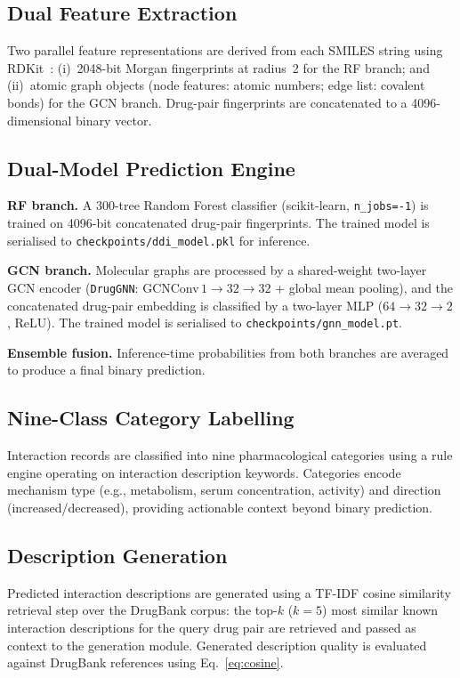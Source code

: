 \documentclass[conference]{IEEEtran}
\begin{document}
\subsection{Dual Feature Extraction}

Two parallel feature representations are derived from each SMILES string using
RDKit~\cite{rdkit}: (i)~2048-bit Morgan fingerprints at radius~2 for the RF branch; and
(ii)~atomic graph objects (node features: atomic numbers; edge list: covalent bonds) for
the GCN branch. Drug-pair fingerprints are concatenated to a 4096-dimensional binary vector.

\subsection{Dual-Model Prediction Engine}

\textbf{RF branch.} A 300-tree Random Forest classifier (scikit-learn, \texttt{n\_jobs=-1})
is trained on 4096-bit concatenated drug-pair fingerprints. The trained model is
serialised to \texttt{checkpoints/ddi\_model.pkl} for inference.

\textbf{GCN branch.} Molecular graphs are processed by a shared-weight two-layer GCN
encoder (\texttt{DrugGNN}: GCNConv\,$1{\to}32{\to}32$ + global mean pooling), and the
concatenated drug-pair embedding is classified by a two-layer MLP
($64{\to}32{\to}2$, ReLU). The trained model is serialised to \texttt{checkpoints/gnn\_model.pt}.

\textbf{Ensemble fusion.} Inference-time probabilities from both branches are averaged to
produce a final binary prediction.

\subsection{Nine-Class Category Labelling}

Interaction records are classified into nine pharmacological categories using a rule engine
operating on interaction description keywords. Categories encode mechanism type (e.g.,
metabolism, serum concentration, activity) and direction (increased/decreased), providing
actionable context beyond binary prediction.

\subsection{Description Generation}

Predicted interaction descriptions are generated using a TF-IDF cosine similarity retrieval
step over the DrugBank corpus: the top-$k$ ($k=5$) most similar known interaction
descriptions for the query drug pair are retrieved and passed as context to the
generation module. Generated description quality is evaluated against DrugBank references
using Eq.~\eqref{eq:cosine}.
\end{document}
